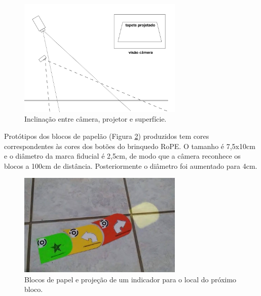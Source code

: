 \begin{figure}[!htpb]
    \centering
    \includegraphics[width=0.7\textwidth, fbox]{figs/homography.png}
    \caption{Inclinação entre câmera, projetor e superfície.}
    \label{fig:homography}
\end{figure}

Protótipos dos blocos de papelão (Figura \ref{fig:paper_blocks}) produzidos tem cores correspondentes às cores dos botões do brinquedo RoPE. O tamanho é 7,5x10cm e o diâmetro da marca fiducial é 2,5cm, de modo que a câmera reconhece os blocos a 100cm de distância. Posteriormente o diâmetro foi aumentado para 4cm.

\begin{figure}[!htpb]
    \centering
    \includegraphics[width=0.7\textwidth, fbox]{figs/paper_blocks.png}
    \caption{Blocos de papel e projeção de um indicador para o local do próximo bloco.}
    \label{fig:paper_blocks}
\end{figure}